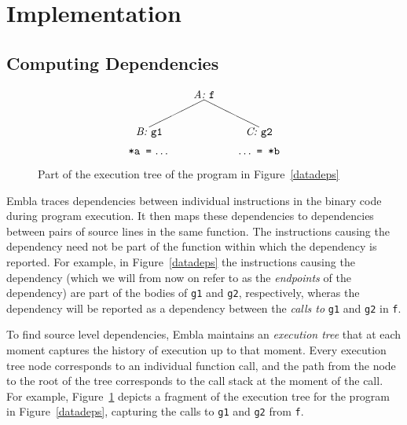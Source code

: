 \section{Implementation}

\subsection{Computing Dependencies}   \label{snca}

\begin{figure} \small
\hrulefill
\[
\begin{picture}(160,60)(70,15)
\put(120,65){\makebox(60,10)[c]{\it A:\ \tt f}}
\put(150,65){\line(-2,-1){50}}
\put(150,65){\line( 2,-1){50}}
\put(170,30){\makebox(60,10)[c]{\it C:\ \tt g2}}
\put(70,30){\makebox(60,10)[c]{\it B:\ \tt g1}}
\put(70,15){\makebox(60,10)[cb]{{\tt *a\ =}\ \ldots}}
\put(170,15){\makebox(60,10)[cb]{\ldots\ {\tt =\ *b}}}
\end{picture}
\]
\hrulefill
\caption{Part of the execution tree of the program in Figure~\ref{datadeps}
} 
\label{ffextree}
\end{figure}

Embla traces dependencies between individual instructions in the binary
code during program execution. It then maps these dependencies to 
dependencies between pairs of source lines in the same function. The
instructions causing the dependency need not be part of the function 
within which the dependency is reported. For example, in 
Figure~\ref{datadeps} the instructions causing the dependency (which we
will from now on refer to as the {\em endpoints} of the dependency) 
are part of the bodies of {\tt g1} and {\tt g2}, respectively, wheras the dependency 
will be reported as a dependency between the {\em calls to} {\tt g1} and 
{\tt g2} in {\tt f}.

To find source level dependencies, Embla maintains an {\em execution tree} 
that at each moment captures 
the history of execution up to that moment. Every execution tree node 
corresponds to an
individual function call, and the path from the node to the root of the
tree corresponds to the call stack at the moment of the call. For
example, Figure~\ref{ffextree} depicts a fragment of the execution tree
for the program in Figure~\ref{datadeps}, capturing the calls to {\tt g1} 
and {\tt g2} from {\tt f}.

